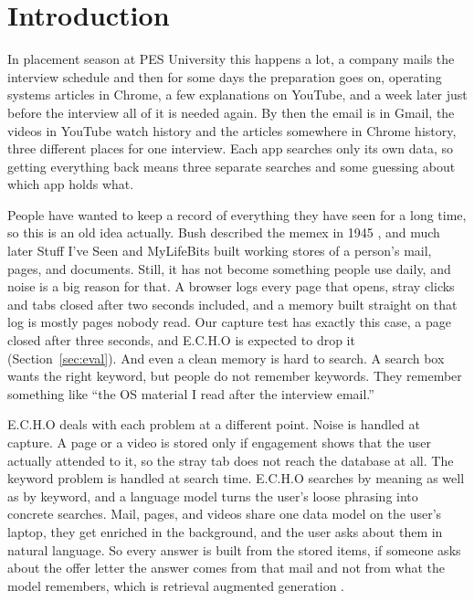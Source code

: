 \documentclass[conference]{IEEEtran}
\begin{document}
\section{Introduction}
In placement season at PES University this happens a lot, a company mails the interview schedule and then for some days the preparation goes on, operating systems articles in Chrome, a few explanations on YouTube, and a week later just before the interview all of it is needed again. By then the email is in Gmail, the videos in YouTube watch history and the articles somewhere in Chrome history, three different places for one interview. Each app searches only its own data, so getting everything back means three separate searches and some guessing about which app holds what.

People have wanted to keep a record of everything they have seen for a long time, so this is an old idea actually. Bush described the memex in 1945 \cite{b1}, and much later Stuff I've Seen \cite{b2} and MyLifeBits \cite{b3} built working stores of a person's mail, pages, and documents. Still, it has not become something people use daily, and noise is a big reason for that. A browser logs every page that opens, stray clicks and tabs closed after two seconds included, and a memory built straight on that log is mostly pages nobody read. Our capture test has exactly this case, a page closed after three seconds, and E.C.H.O is expected to drop it (Section~\ref{sec:eval}). And even a clean memory is hard to search. A search box wants the right keyword, but people do not remember keywords. They remember something like ``the OS material I read after the interview email.''

E.C.H.O deals with each problem at a different point. Noise is handled at capture. A page or a video is stored only if engagement shows that the user actually attended to it, so the stray tab does not reach the database at all. The keyword problem is handled at search time. E.C.H.O searches by meaning as well as by keyword, and a language model turns the user's loose phrasing into concrete searches. Mail, pages, and videos share one data model on the user's laptop, they get enriched in the background, and the user asks about them in natural language. So every answer is built from the stored items, if someone asks about the offer letter the answer comes from that mail and not from what the model remembers, which is retrieval augmented generation \cite{b4}.
\end{document}

